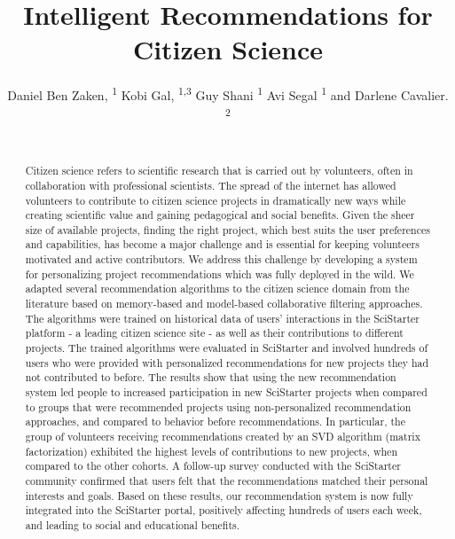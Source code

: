 \documentclass[letterpaper]{article} %
\title{Intelligent Recommendations for Citizen Science}
\author{
    Daniel Ben Zaken, \textsuperscript{\rm 1}
    Kobi Gal, \textsuperscript{\rm 1,3}
    Guy Shani \textsuperscript{\rm 1}
    Avi Segal \textsuperscript{\rm 1} and
    Darlene Cavalier. \textsuperscript{\rm 2}
    \\
    \\
}
\begin{document}
\maketitle
\begin{abstract}
Citizen science refers to scientific research that is carried out by volunteers, often in collaboration with professional scientists.
The spread of the internet has allowed volunteers to contribute to citizen science projects in  dramatically new ways while creating scientific value and gaining pedagogical and social benefits.
Given the sheer size of available projects, finding the right project, which best suits the user preferences and capabilities, has become a major challenge and is essential for keeping volunteers motivated and active contributors.
We address this challenge by developing a system for personalizing  project recommendations which was fully deployed in  the wild.
We adapted several recommendation algorithms to the citizen science domain from the literature based on memory-based and model-based collaborative filtering approaches.  The algorithms were trained on historical data of users' interactions in the SciStarter platform - a leading citizen science site -
as well as their contributions to different projects.
The trained algorithms were evaluated in SciStarter and involved hundreds of users who were  provided with personalized recommendations for  new  projects they had not contributed to before. %
The results show that using the new recommendation system  led people to  increased participation in new SciStarter projects when compared to   groups that were recommended projects using non-personalized
 recommendation approaches,
and compared to behavior before recommendations.   In particular, the group of volunteers receiving recommendations created by an SVD algorithm (matrix factorization) exhibited the highest levels of contributions to new projects, when compared to the other cohorts.
A follow-up survey conducted with the SciStarter
community confirmed that users felt that the recommendations  matched their personal interests and goals.
Based on these results, our recommendation system is now fully integrated into the SciStarter  portal, positively affecting hundreds of users each week, and  leading to social and educational benefits.

\end{abstract}
\end{document}
